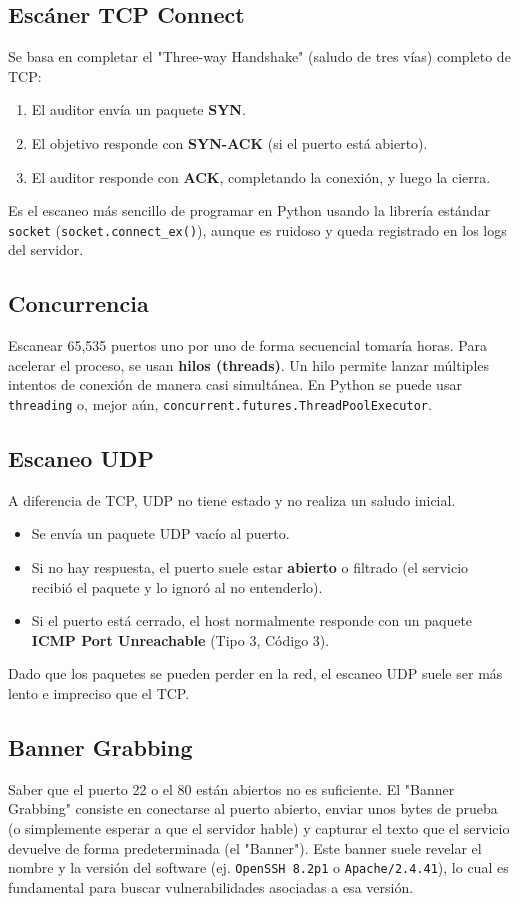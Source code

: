 \documentclass[12pt,a4paper]{article}
\begin{document}
\subsection{Escáner TCP Connect}
Se basa en completar el "Three-way Handshake" (saludo de tres vías) completo de TCP:
\begin{enumerate}
    \item El auditor envía un paquete \textbf{SYN}.
    \item El objetivo responde con \textbf{SYN-ACK} (si el puerto está abierto).
    \item El auditor responde con \textbf{ACK}, completando la conexión, y luego la cierra.
\end{enumerate}
Es el escaneo más sencillo de programar en Python usando la librería estándar \texttt{socket} (\texttt{socket.connect\_ex()}), aunque es ruidoso y queda registrado en los logs del servidor.

\subsection{Concurrencia}
Escanear 65,535 puertos uno por uno de forma secuencial tomaría horas. Para acelerar el proceso, se usan \textbf{hilos (threads)}. Un hilo permite lanzar múltiples intentos de conexión de manera casi simultánea. En Python se puede usar \texttt{threading} o, mejor aún, \texttt{concurrent.futures.ThreadPoolExecutor}.

\subsection{Escaneo UDP}
A diferencia de TCP, UDP no tiene estado y no realiza un saludo inicial.
\begin{itemize}
    \item Se envía un paquete UDP vacío al puerto.
    \item Si no hay respuesta, el puerto suele estar \textbf{abierto} o filtrado (el servicio recibió el paquete y lo ignoró al no entenderlo).
    \item Si el puerto está cerrado, el host normalmente responde con un paquete \textbf{ICMP Port Unreachable} (Tipo 3, Código 3).
\end{itemize}
Dado que los paquetes se pueden perder en la red, el escaneo UDP suele ser más lento e impreciso que el TCP.

\subsection{Banner Grabbing}
Saber que el puerto 22 o el 80 están abiertos no es suficiente. El "Banner Grabbing" consiste en conectarse al puerto abierto, enviar unos bytes de prueba (o simplemente esperar a que el servidor hable) y capturar el texto que el servicio devuelve de forma predeterminada (el "Banner"). Este banner suele revelar el nombre y la versión del software (ej. \texttt{OpenSSH 8.2p1} o \texttt{Apache/2.4.41}), lo cual es fundamental para buscar vulnerabilidades asociadas a esa versión.
\end{document}
